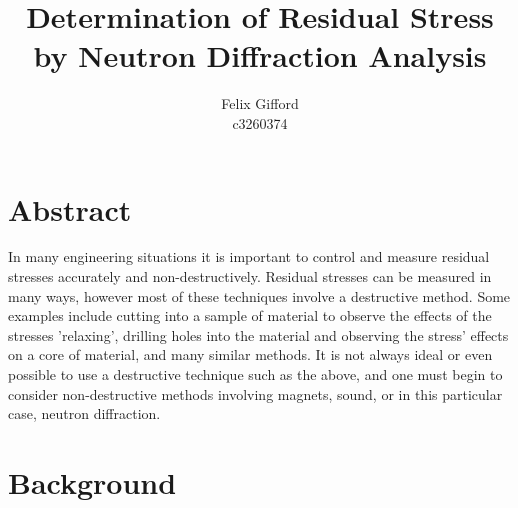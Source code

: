 \documentclass[11pt, oneside]{article}   	%
\title{Determination of Residual Stress by Neutron Diffraction Analysis}
\author{Felix Gifford\\c3260374}
\begin{document}
\maketitle
\section{Abstract}
In many engineering situations it is important to control and measure residual stresses accurately and non-destructively. Residual stresses can be measured in many ways, however most of these techniques involve a destructive method. Some examples include cutting into a sample of material to observe the effects of the stresses 'relaxing', drilling holes into the material and observing the stress' effects on a core of material, and many similar methods. It is not always ideal or even possible to use a destructive technique such as the above, and one must begin to consider non-destructive methods involving magnets, sound, or in this particular case, neutron diffraction.
\section{Background}
\end{document}
